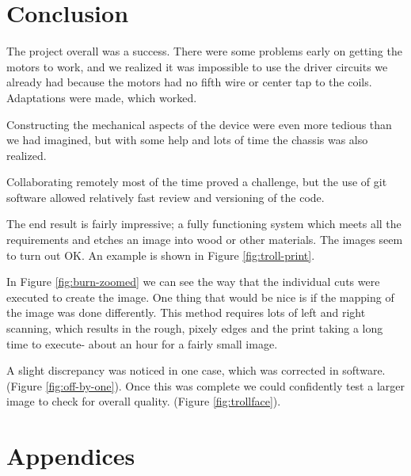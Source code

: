 \documentclass[11pt]{LaTeX-Classes/math-hw}
\begin{document}
\section{Conclusion}
The project overall was a success. There were some problems early on getting the motors to work,
and we realized it was impossible to use the driver circuits we already had because the motors
had no fifth wire or center tap to the coils. Adaptations were made, which worked.

Constructing the mechanical aspects of the device were even more tedious than we had imagined,
but with some help and lots of time the chassis was also realized. 

Collaborating remotely most of the time proved a challenge, but the use of git software allowed
relatively fast review and versioning of the code.

The end result is fairly impressive; a fully functioning system which meets all the requirements
and etches an image into wood or other materials.
The images seem to turn out OK. An example is shown in Figure \ref{fig:troll-print}.

In Figure \ref{fig:burn-zoomed} we can see the way that the individual cuts were executed to
create the image. One thing that would be nice is if the mapping of the image was done differently.
This method requires lots of left and right scanning, which results in the rough, pixely edges
and the print taking a long time to execute- about an hour for a fairly small image.

A slight discrepancy was noticed in one case, which was corrected in software.
(Figure \ref{fig:off-by-one}).
Once this was complete we could confidently test a larger image to check for overall quality.
(Figure \ref{fig:trollface}).

\section*{Appendices}
\end{document}
